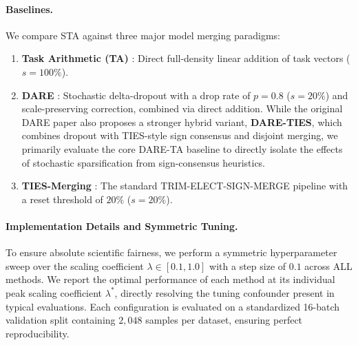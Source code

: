 \paragraph{Baselines.}
We compare STA against three major model merging paradigms:
\begin{enumerate}
    \item \textbf{Task Arithmetic (TA)} \cite{Ilharco2022}: Direct full-density linear addition of task vectors ($s = 100\%$).
    \item \textbf{DARE} \cite{Yu24}: Stochastic delta-dropout with a drop rate of $p = 0.8$ ($s = 20\%$) and scale-preserving correction, combined via direct addition. While the original DARE paper also proposes a stronger hybrid variant, \textbf{DARE-TIES}, which combines dropout with TIES-style sign consensus and disjoint merging, we primarily evaluate the core DARE-TA baseline to directly isolate the effects of stochastic sparsification from sign-consensus heuristics.
    \item \textbf{TIES-Merging} \cite{Yadav2023}: The standard TRIM-ELECT-SIGN-MERGE pipeline with a reset threshold of $20\%$ ($s = 20\%$).
\end{enumerate}

\paragraph{Implementation Details and Symmetric Tuning.}
To ensure absolute scientific fairness, we perform a symmetric hyperparameter sweep over the scaling coefficient $\lambda \in [0.1, 1.0]$ with a step size of $0.1$ across ALL methods. We report the optimal performance of each method at its individual peak scaling coefficient $\lambda^*$, directly resolving the tuning confounder present in typical evaluations. Each configuration is evaluated on a standardized 16-batch validation split containing $2{,}048$ samples per dataset, ensuring perfect reproducibility.

